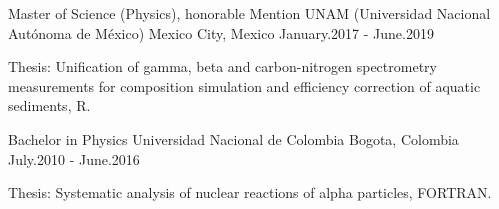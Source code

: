 

\begin{cventries}

  \cventry
    {Master of Science (Physics), honorable Mention} %
    {UNAM (Universidad Nacional Autónoma de México)} %
    {Mexico City,  Mexico} %
    {January.2017 - June.2019} %
    {
      \begin{cvitems} %
        \item {Thesis: Unification of gamma, beta and carbon-nitrogen spectrometry measurements for composition simulation and efficiency correction of aquatic sediments, R. }
      \end{cvitems}
    }
  \cventry
    {Bachelor in Physics} %
    {Universidad Nacional de Colombia} %
    {Bogota,  Colombia} %
    {July.2010 - June.2016} %
    {
      \begin{cvitems} %
        \item {Thesis: Systematic analysis of nuclear reactions of alpha particles, FORTRAN.}
      \end{cvitems}
    }
\end{cventries}
